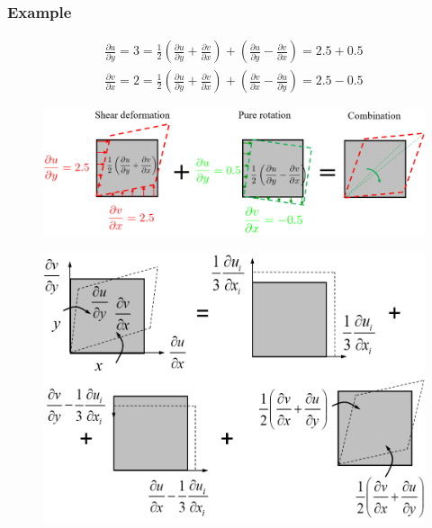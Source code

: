 \documentclass[class=report, crop=false, 12pt,a4paper]{standalone}
\begin{document}
\subsubsection{Example}
\begin{gather}
  \frac{\partial u}{\partial y}=3=\frac{1}{2} \left(\frac{\partial u}{\partial y} + \frac{\partial v}{\partial x}\right) + \left(\frac{\partial u}{\partial y} - \frac{\partial v}{\partial x}\right) = 2.5 + 0.5\\
  \frac{\partial v}{\partial x}=2=\frac{1}{2} \left(\frac{\partial u}{\partial y} + \frac{\partial v}{\partial x}\right) + \left(\frac{\partial v}{\partial x} - \frac{\partial u}{\partial y}\right) = 2.5 - 0.5
\end{gather}
\begin{figure}[H]
  \centering
  \includegraphics[width = \textwidth]{../img/diagram6.png}
\end{figure}
\begin{figure}[H]
  \centering
  \includegraphics[width = 0.8 \textwidth]{../img/diagram7.png}
\end{figure}
\end{document}
